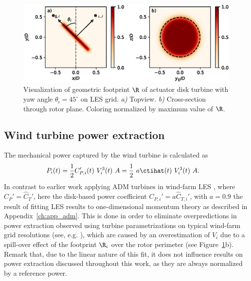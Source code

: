 \begin{figure}
	\centering
	\includegraphics[width=\textwidth]{chapters/methodology/visualize_R.eps}
	\caption{Visualization of geometric footprint $\R$ of actuator disk turbine with yaw angle $\theta_i = 45^\circ$ on LES grid. \emph{a)} Topview. \emph{b)} Cross-section through rotor plane. Coloring normalized by maximum value of $\R$. \label{fig:Rkernel}}
\end{figure}

\subsection{Wind turbine power extraction}
The mechanical power captured by the wind turbine is calculated as 
\begin{align}
P_i(t) &= \frac{1}{2} C_{P,i}'(t)~V_{i}^3(t)~A = \frac{1}{2}~a\ctihat(t)~V_{i}^3(t)~A.\label{eq:define_power}
\end{align}
In contrast to earlier work applying ADM turbines in wind-farm LES \citep{meyers2010large, calaf2010large, goit2015optimal}, where $C_P' = \widehat{C}_T'$, here the disk-based power coefficient $C_{P,i}' = a\widehat{C}_{T,i}'$, with $a = 0.9$ the result of fitting LES results to one-dimensional momentum theory as described in Appendix~\ref{ch:app_adm}. This is done in order to eliminate overpredictions in power extraction observed using turbine parametrizations on typical wind-farm grid resolutions (see, e.g. \citealp{martinez2016wind, martinez2015large}), which are caused by an overestimation of $V_i$ due to a spill-over effect of the footprint $\R_i$ over the rotor perimeter (see Figure~\ref{fig:Rkernel}b). Remark that, due to the linear nature of this fit, it does not influence results on power extraction discussed throughout this work, as they are always normalized by a reference power. 

